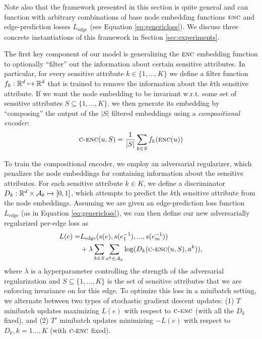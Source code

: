 Note also that the framework presented in this section is quite general and can function with arbitrary combinations of base node embedding functions $\textsc{enc}$ and edge-prediction losses $L_{\textrm{edge}}$ (see Equation \ref{eq:genericloss}).
We discuss three concrete instantiations of this framework in Section \ref{sec:experiments}.

The first key component of our model is generalizing the $\textsc{enc}$ embedding function to optionally ``filter'' out the information about certain sensitive attributes. 
In particular, for every sensitive attribute $k \in \{1, ..., K\}$ we define a filter function $f_k : \mathbb{R}^d \mapsto \mathbb{R}^d$ that is trained to remove the information about the $k$th sensitive attribute. 
If we want the node embedding to be invariant w.r.t. some set of sensitive attributes $S \subseteq \{1,...,K\}$, we then generate its embedding by ``composing'' the output of the $|S|$ filtered embeddings using a {\em compositional encoder}:
\begin{equation}
    \textsc{c-enc}(u, S) = \frac{1}{|S|}\sum_{k \in S}f_k(\textsc{enc}(u))
\end{equation}

To train the compositional encoder, we employ an adversarial regularizer, which penalizes the node embeddings for containing information about the sensitive attributes.
For each sensitive attribute $k \in K$, we define a discriminator $D_k : \mathbb{R}^{d} \times \mathcal{A}_k \mapsto [0,1]$, which attempts to predict the $k$th sensitive attribute from the node embeddings. 
Assuming we are given an edge-prediction loss function $L_\textrm{edge}$ (as in Equation \ref{eq:genericloss}), we can then define our new adversarially regularized per-edge loss as
\begin{align}\label{eq:loss}
    L(e) = &L_{\textrm{edge}}(s(e), s(e^{-1}_1), ..., s(e^{-1}_m)) \nonumber \\ &+ \lambda \sum_{k \in S}\sum_{a^k \in \mathcal{A}_k}\log(D_k(\textsc{c-enc}(u, S), a^k)),
\end{align}
where $\lambda$ is a hyperparameter controlling the strength of the adversarial regularization and $S \subseteq \{1,...,K\}$ is the set of sensitive attributes that we are enforcing invariance on for this edge. 
To optimize this loss in a minibatch setting, we alternate between two types of stochastic gradient descent updates: (1) $T$ minibatch updates maximizing $L(e)$ with respect to $\textsc{c-enc}$ (with all the $D_k$ fixed), and (2) $T'$ minibatch updates  minimizing $-L(e)$ with respect to $D_k, k=1...,K$ (with $\textsc{c-enc}$ fixed).  



